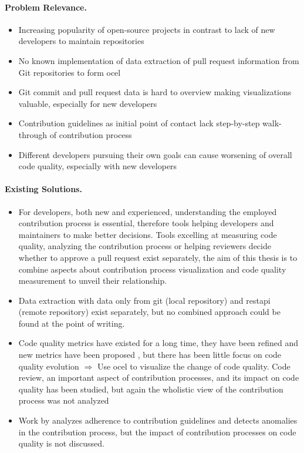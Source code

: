 \paragraph{Problem Relevance.} 
\begin{itemize}
	\item Increasing popularity of open-source projects in contrast to lack of new developers to maintain repositories \autocite{DBLP:journals/corr/abs-2208-04895}\autocite{DBLP:journals/ese/RehmanWKIM22}
	\item No known implementation of data extraction of pull request information from Git repositories to form \ac{ocel}
	\item Git commit and pull request data is hard to overview making visualizations valuable, especially for new developers
	\item Contribution guidelines as initial point of contact \autocite{DBLP:conf/icsm/ElazharySEZ19} lack step-by-step walk-through of contribution process
	\item Different developers pursuing their own goals can cause worsening of overall code quality, especially with new developers
\end{itemize}

\paragraph{Existing Solutions.}
\begin{itemize}
	\item For developers, both new and experienced, understanding the employed contribution process is essential, therefore tools helping developers and maintainers to make better decisions. Tools excelling at measuring code quality, analyzing the contribution process or helping reviewers decide whether to approve a pull request exist separately, the aim of this thesis is to combine aspects about contribution process visualization and code quality measurement to unveil their relationship.
	\item Data extraction with data only from git (local repository) and \ac{restapi} (remote repository) exist separately, but no combined approach could be found at the point of writing.
	\item Code quality metrics have existed for a long time, they have been refined and new metrics have been proposed \autocite{DBLP:journals/smr/CodabuxSC24}, but there has been little focus on code quality evolution $\Rightarrow$ Use \ac{ocel} to visualize the change of code quality. Code review, an important aspect of contribution processes, and its impact on code quality has been studied, but again the wholistic view of the contribution process was not analyzed \autocite{DBLP:journals/ese/McIntoshKAH16}
	\item Work by \autocite{DBLP:conf/icsm/ElazharySEZ19} analyzes adherence to contribution guidelines and detects anomalies in the contribution process, but the impact of contribution processes on code quality is not discussed.
\end{itemize}


